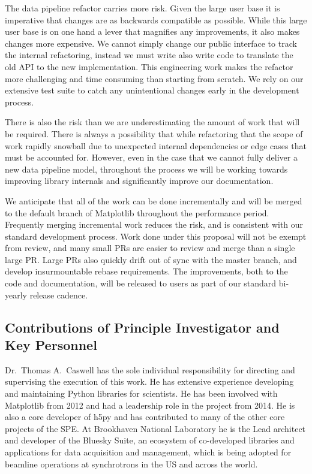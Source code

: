 \documentclass[12pt]{article}
\numberwithin{page}{section}
\begin{document}
The data pipeline refactor carries more risk.  Given the large user
base it is imperative that changes are as backwards compatible as
possible.  While this large user base is on one hand a lever that
magnifies any improvements, it also makes changes more expensive.  We
cannot simply change our public interface to track the internal
refactoring, instead we must write also write code to translate the
old API to the new implementation.  This engineering work makes the
refactor more challenging and time consuming than starting from
scratch.  We rely on our extensive test suite to catch any unintentional
changes early in the development process.

There is also the risk than we are underestimating the amount of work
that will be required.  There is always a possibility that while
refactoring that the scope of work rapidly snowball due to unexpected
internal dependencies or edge cases that must be accounted for.
However, even in the case that we cannot fully deliver a new data
pipeline model, throughout the process we will be working towards
improving library internals and significantly improve our
documentation.

We anticipate that all of the work can be done incrementally and will
be merged to the default branch of Matplotlib throughout the
performance period.  Frequently merging incremental work reduces the
risk, and is consistent with our standard development process.  Work
done under this proposal will not be exempt from review, and many
small PRs are easier to review and merge than a single large PR.
Large PRs also quickly drift out of sync with the master branch, and
develop insurmountable rebase requirements.  The improvements, both to
the code and documentation, will be released to users as part of our
standard bi-yearly release cadence.


\subsection{Contributions of Principle Investigator and Key Personnel}

Dr.\ Thomas A.\ Caswell has the sole individual responsibility for
directing and supervising the execution of this work.  He has
extensive experience developing and maintaining Python libraries for
scientists.  He has been involved with Matplotlib from 2012 and had a
leadership role in the project from 2014.  He is also a core developer
of h5py and has contributed to many of the other core projects of the
SPE.  At Brookhaven National Laboratory he is the Lead architect and
developer of the Bluesky Suite, an ecosystem of co-developed libraries
and applications for data acquisition and management, which is being
adopted for beamline operations at synchrotrons in the US and across
the world.
\end{document}
